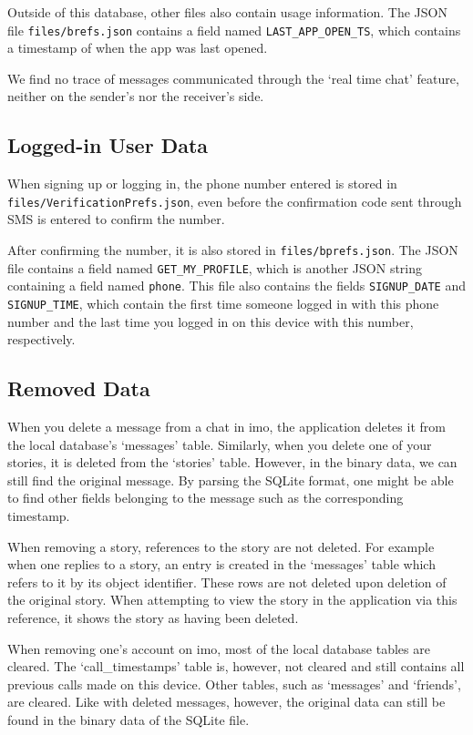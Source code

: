 \documentclass[conference]{IEEEtran}
\begin{document}
Outside of this database, other files also contain usage information. The JSON
file \texttt{files/brefs.json} contains a field named
\texttt{LAST\_APP\_OPEN\_TS}, which contains a timestamp of when the app was
last opened.

We find no trace of messages communicated through the `real time chat' feature,
neither on the sender's nor the receiver's side.


\subsection{Logged-in User Data}

When signing up or logging in, the phone number entered is stored in
\texttt{files/VerificationPrefs.json}, even before the confirmation code sent
through SMS is entered to confirm the number.

After confirming the number, it is also stored in \texttt{files/bprefs.json}.
The JSON file contains a field named \texttt{GET\_MY\_PROFILE}, which is
another JSON string containing a field named \texttt{phone}. This file also
contains the fields \texttt{SIGNUP\_DATE} and \texttt{SIGNUP\_TIME}, which
contain the first time someone logged in with this phone number and the last
time you logged in on this device with this number, respectively.


\subsection{Removed Data}

When you delete a message from a chat in imo, the application deletes it from
the local database's `messages' table. Similarly, when you delete one of your
stories, it is deleted from the `stories' table. However, in the binary data,
we can still find the original message. By parsing the SQLite format, one might
be able to find other fields belonging to the message such as the corresponding
timestamp.

When removing a story, references to the story are not deleted. For example
when one replies to a story, an entry is created in the `messages' table which
refers to it by its object identifier. These rows are not deleted upon deletion
of the original story. When attempting to view the story in the application via
this reference, it shows the story as having been deleted.

When removing one's account on imo, most of the local database tables are
cleared. The `call\_timestamps' table is, however, not cleared and still
contains all previous calls made on this device. Other tables, such as
`messages' and `friends', are cleared. Like with deleted messages, however, the
original data can still be found in the binary data of the SQLite file.
\end{document}
